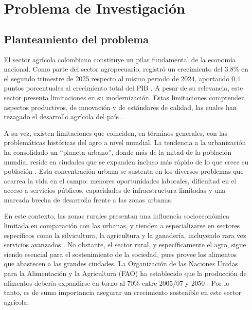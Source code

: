\chapter{Problema de Investigación}

\section{Planteamiento del problema}

El sector agrícola colombiano constituye un pilar  fundamental  de  la  economía
nacional. Como parte del sector agropecuario, registró un crecimiento del  3.8\%
en el segundo trimestre de 2025 respecto al mismo periodo de 2024, aportando 0,4
puntos porcentuales al crecimiento total del  PIB  \parencite{DANEPIB2025II}.  A
pesar de su relevancia, este sector presenta limitaciones en  su  modernización.
Estas  limitaciones  comprenden  aspectos  productivos,  de  innovación   y   de
estándares de calidad, las cuales han rezagado el desarrollo agrícola  del  país
\parencite{montoyaagricultura}.

A su vez, existen limitaciones que coinciden, en  términos  generales,  con  las
problemáticas  históricas  del  agro  a  nivel  mundial.  La  tendencia   a   la
urbanización ha consolidado un “planeta urbano”, donde más de  la  mitad  de  la
población mundial reside en ciudades que se expanden incluso más  rápido  de  lo
que crece su población \parencite{cambra2022re}. Esta  concentración  urbana  se
sustenta en los diversos problemas que acarrea la  vida  en  el  campo:  menores
oportunidades  laborales,  dificultad  en  el  acceso  a   servicios   públicos,
capacidades de infraestructura limitadas  \parencite{alabdali2023influential}  y
una marcada brecha de desarrollo frente a las zonas urbanas.

En este contexto, las zonas  rurales  presentan  una  influencia  socioeconómica
limitada en comparación con las urbanas, y tienden a especializarse en  sectores
específicos como la silvicultura, la agricultura y la ganadería, incluyendo rara
vez servicios avanzados  \parencite{alabdali2023influential}.  No  obstante,  el
sector  rural,  y  específicamente  el  agro,  sigue  siendo  esencial  para  el
sostenimiento de la sociedad, pues provee los  alimentos  que  abastecen  a  las
grandes ciudades. La Organización de las Naciones Unidas para la Alimentación  y
la Agricultura (FAO) ha establecido  que  la  producción  de  alimentos  debería
expandirse     en     torno     al     70\%     entre     2005/07     y     2050
\parencite{fao_agricultura_mundial}.  Por  lo  tanto,  es  de  suma  importancia
asegurar un crecimiento sostenible en este sector agrícola.

